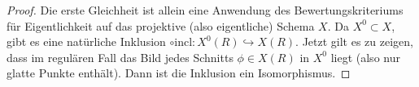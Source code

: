 \documentclass[german]{scrreprt}
\begin{document}
\begin{Satz}
  \begin{proof}
    Die erste Gleichheit ist allein eine Anwendung des
    Bewertungskriteriums für Eigentlichkeit auf das projektive (also
    eigentliche) Schema $X$.
    Da $X^0\subset X$, gibt es eine natürliche Inklusion
    $\circ \text{incl}\colon X^0(R)\hookrightarrow X(R)$.
    Jetzt gilt es zu zeigen, dass im regulären Fall das Bild jedes
    Schnitts $\phi\in X(R)$ in $X^0$ liegt (also nur glatte Punkte
    enthält). Dann ist die Inklusion ein Isomorphismus.
    

\end{proof}
\end{Satz}
\end{document}
